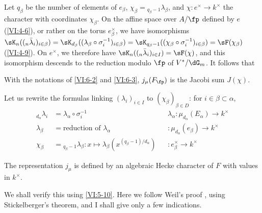 Let $q_\beta$ be the number of elements of $e_\beta$, 
  $\chi_\beta={}_{q_\beta-1}\lambda_\beta$, and 
$\chi:e^\times \to k^\times$ the character with coordinates $\chi_\beta$. On the 
affine space over $A/\fp$ defined by $e$ (\ref{VI:4-6}), or rather on the torus 
$e_\beta^\times$, we have isomorphisms 
  $\sK_n((_n\bar\lambda_i)_{i\in\beta}) = \sK_{d_\beta}((\lambda_\beta \circ \sigma_i^{-1})_{i\in\beta}) =\sK_{q_\beta-1}((\chi_\beta\circ \sigma_i^{-1})_{i\in\beta}) = \sF(\chi_\beta)$ (\ref{VI:4-9}). 
  On $e^\times$, we therefore have $\sK_n((_n\bar\lambda_i)_{i\in I}) = \sF(\chi)$, 
and this isomorphism descends to the reduction modulo $\fp$ of $V^\ast/\dG_m$. 
It follows that





\begin{proposition_}\label{VI:6-4}
With the notations of \ref{VI:6-2} and \ref{VI:6-3}, $j_\mu(F_\fp)$ is the 
Jacobi sum $J(\chi)$. 
\end{proposition_}

Let us rewrite the formulas linking $(\lambda_i)_{i\in I}$ to 
  $(\chi_\beta)_{\beta\in D}$: for $i\in \beta\subset \alpha$, 
\begin{align*}
  _{d_\alpha} \lambda_i &= \lambda_\alpha\circ \sigma_i^{-1} && \lambda_\alpha:\mu_{d_\alpha}(E_\alpha) \to k^\times \\
  \lambda_\beta &= \text{reduction of $\lambda_\alpha$} && :\mu_{d_\alpha}(e_\beta) \to k^\times \\
  \chi_\beta &= {}_{q_\beta-1}\lambda_\beta: x\mapsto \lambda_\beta(x^{(q_\beta-1)/d_\alpha}) && :e_\beta^\times \to k^\times 
\end{align*}





\begin{theorem_}\label{VI:6-5}
The representation $j_\mu$ is defined by an algebraic Hecke character 
of $F$ with values in $k^\times$. 
\end{theorem_}

We shall verify this using \ref{VI:5-10}. Here we follow Weil's 
proof \cite{we52,we74-2}, using Stickelberger's theorem, 
and I shall give only a few indications. 





\subsection{}\label{VI:6-6}

